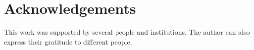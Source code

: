 \pagestyle{MyThesisStyle}
\chapter*{Acknowledgements}\label{acknowledgements}

{\sloppy This work was supported by several people and institutions. The author can also express their gratitude to different people.}
